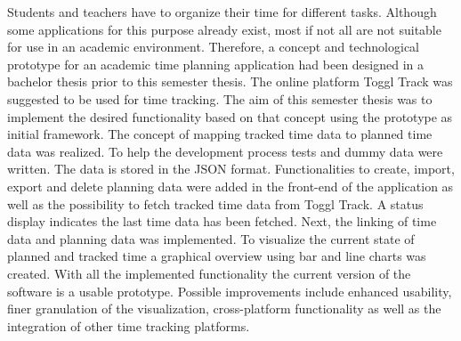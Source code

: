 
Students and teachers have to organize their time for different tasks. Although some applications for this purpose already exist, most if not all are not suitable for use in an academic environment. Therefore, a concept and technological prototype for an academic time planning application had been designed in a bachelor thesis prior to this semester thesis. The online platform Toggl Track was suggested to be used for time tracking. The aim of this semester thesis was to implement the desired functionality based on that concept using the prototype as initial framework. The concept of mapping tracked time data to planned time data was realized. To help the development process tests and dummy data were written. The data is stored in the JSON format. Functionalities to create, import, export and delete planning data were added in the front-end of the application as well as the possibility to fetch tracked time data from Toggl Track. A status display indicates the last time data has been fetched. Next, the linking of time data and planning data was implemented. To visualize the current state of planned and tracked time a graphical overview using bar and line charts was created. With all the implemented functionality the current version of the software is a usable prototype. Possible improvements include enhanced usability, finer granulation of the visualization, cross-platform functionality as well as the integration of other time tracking platforms. 
